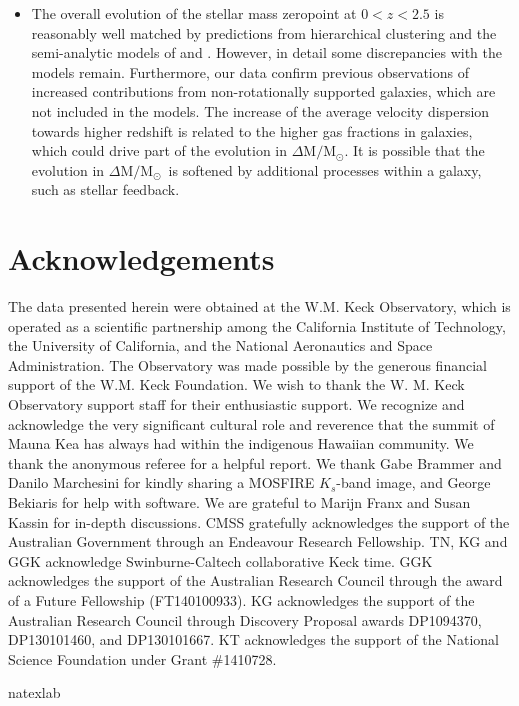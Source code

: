 \documentclass{emulateapj}
\newcommand{\msun}{$\mathrm{M_{\odot}}$}
\begin{document}
{\begin{itemize}
\item {T}he overall evolution of the stellar mass zeropoint at $0 < z < 2.5$ is reasonably well matched by {predictions from hierarchical cluster{ing} \citep{Mo98} and} the semi-analytic models of {\citet{Somerville08} and} \citet{Dutton11}. However, in detail some discrepancies with the models remain. Furthermore, our data confirm previous observations of increased contributions from non-rotationally supported galaxies, which are not included in the models. The increase of the average velocity dispersion towards higher redshift is related to the higher gas fractions in galaxies{, which could drive part of the evolution in $\Delta \mathrm{M}/$\msun}. It is possible that the evolution in $\Delta \mathrm{M}/$\msun\ {is softened by additional processes within a galaxy, such as stellar feedback}.
\end{itemize}

\section{Acknowledgements}
The data presented herein were obtained at the W.M. Keck Observatory, which is operated as a scientific partnership among the California Institute of Technology, the University of California, and the National Aeronautics and Space Administration. The Observatory was made possible by the generous financial support of the W.M. Keck Foundation. We wish to thank the W. M. Keck Observatory support staff for their enthusiastic support. We recognize and acknowledge the very significant cultural role and reverence that the summit of Mauna Kea has always had within the indigenous Hawaiian community. We thank the anonymous referee for a helpful report. We thank Gabe Brammer and Danilo Marchesini for kindly sharing a MOSFIRE $K_s$-band image, and George Bekiaris for help with software. We are grateful to {Marijn Franx and} Susan Kassin for in-depth discussions. CMSS gratefully acknowledges the support of the Australian Government through an Endeavour Research Fellowship. {TN, KG and GGK acknowledge Swinburne-Caltech collaborative Keck time.} GGK acknowledges the support of the Australian Research Council through the award of a Future Fellowship (FT140100933). {KG acknowledges the support of the Australian Research Council through Discovery Proposal awards DP1094370, DP130101460, and DP130101667. KT acknowledges the support of the National Science Foundation under Grant \#1410728.}


%
%
\begin{thebibliography}{}
\expandafter\ifx\csname natexlab\endcsname\relax\def\natexlab#1{#1}\fi


\end{thebibliography}}
\end{document}
